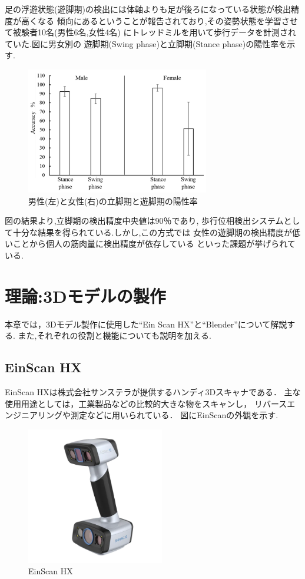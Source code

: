 \documentclass{ltjsreport}
\begin{document}
		足の浮遊状態(遊脚期)の検出には体軸よりも足が後ろになっている状態が検出精度が高くなる
		傾向にあるということが報告されており,その姿勢状態を学習させて被験者10名(男性6名,女性4名)
		にトレッドミルを用いて歩行データを計測されていた.図に男女別の
		遊脚期(Swing phase)と立脚期(Stance phase)の陽性率を示す.

		\begin{figure}[H]
		\centering
		\includegraphics[width = 8cm]{../figs/sensors-21-01081-g010.jpg}
		\caption{男性(左)と女性(右)の立脚期と遊脚期の陽性率}
		\label{fig:RR-malefemale}
		\end{figure}

		図の結果より,立脚期の検出精度中央値は90％であり,
		歩行位相検出システムとして十分な結果を得られている.しかし,この方式では
		女性の遊脚期の検出精度が低いことから個人の筋肉量に検出精度が依存している
		といった課題が挙げられている.



\chapter{理論:3Dモデルの製作}
	本章では，3Dモデル製作に使用した``Ein Scan HX''と``Blender''について解説する.
	また,それぞれの役割と機能についても説明を加える.

	\section{EinScan HX}
		EinScan HXは株式会社サンステラが提供するハンディ3Dスキャナである．
		主な使用用途としては，工業製品などの比較的大きな物をスキャンし，
		リバースエンジニアリングや測定などに用いられている．
		図にEinScanの外観を示す.

		\begin{figure}[H]
		\centering
		\includegraphics[width = 6cm]{../figs/EinScan.png}
		\caption{EinScan HX}
		\label{fig:EinScan}
		\end{figure}
\end{document}
